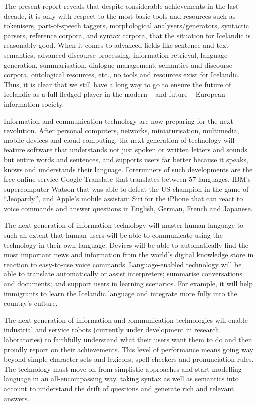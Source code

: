 \begin{multicols}{2}
The present report reveals that despite considerable achievements in the last decade, it is only with respect to the most basic tools and resources such as tokenisers, part-of-speech taggers, morphological analysers/generators, syntactic parsers, reference corpora, and syntax corpora, that the situation for Icelandic is reasonably good. When it comes to advanced fields like sentence and text semantics, advanced discourse processing, information retrieval, language generation, summarisation, dialogue management, semantics and discourse corpora, ontological resources, etc., no tools and resources exist for Icelandic. Thus, it is clear that we still have a long way to go to ensure the future of Icelandic as a full-fledged player in the modern -- and future -- European information society.

Information and communication technology are now preparing for the next revolution. After personal computers, networks, miniaturisation, multimedia, mobile devices and cloud-computing, the next generation of technology will feature software that understands not just spoken or written letters and sounds but entire words and sentences, and supports users far better because it speaks, knows and understands their language. Forerunners of such developments are the free online service Google Translate that translates between 57 languages, IBM’s supercomputer Watson that was able to defeat the US-champion in the game of “Jeopardy”, and Apple’s mobile assistant Siri for the iPhone that can react to voice commands and answer questions in English, German, French and Japanese. 

The next generation of information technology will master human language to such an extent that human users will be able to communicate using the technology in their own language. Devices will be able to automatically find the most important news and information from the world’s digital knowledge store in reaction to easy-to-use voice commands. Language-enabled technology will be able to translate automatically or assist interpreters; summarise conversations and documents;  and support users in learning scenarios. For example, it will help immigrants to learn the Icelandic language and integrate more fully into the country’s culture.
 
The next generation of information and communication technologies will enable industrial and service robots (currently under development in research laboratories) to faithfully understand what their users want them to do and then proudly report on their achievements. This level of performance means going way beyond simple character sets and lexicons, spell checkers and pronunciation rules. The technology must move on from simplistic approaches and start modelling language in an all-encompassing way, taking syntax as well as semantics into account to understand the drift of questions and generate rich and relevant answers.


\end{multicols}
